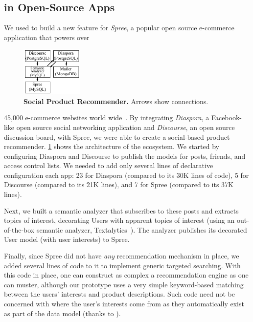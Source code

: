 \subsection{\synapse in Open-Source Apps}
\label{synapse:sec:apps:social}
\begingroup
\setlength{\columnsep}{6pt}
We used \synapse to build a new feature for \emph{Spree}, a popular open source
e-commerce application that powers over
\begin{figure}
\centering
   \includegraphics[width=1.2in]{figures/synapse/eco-social.pdf}
      \vspace{-6pt}
   \caption{\textbf{Social Product Recommender.} Arrows show \synapse
connections.}
   \label{synapse:fig:social-ecosystem}
\end{figure}
45,000 e-commerce websites world
wide~\cite{spree-site}.
By integrating \emph{Diaspora}, a Facebook-like open source social networking
application and \emph{Discourse}, an open source discussion board, with Spree,
we
were able to create a social-based product recommender.
\F\ref{synapse:fig:social-ecosystem} shows the architecture of the ecosystem.
We started by configuring Diaspora and Discourse to publish the models
for posts, friends, and access control lists.
We needed to add only several lines of declarative configuration each app: 23
for Diaspora (compared to its 30K lines of code), 5 for Discourse (compared to
its 21K lines), and 7 for Spree (compared to its 37K lines).

Next, we built a semantic analyzer that subscribes to these posts and extracts topics of interest, decorating Users with apparent topics of interest (using an out-of-the-box semantic analyzer, Textalytics~\cite{textalytics}).
The analyzer publishes its decorated {\code User} model (with user interests) to Spree.
\endgroup

Finally, since Spree did not have \emph{any} recommendation mechanism in place, we added several lines of code to it to implement generic targeted searching.
With this code in place, one can construct as complex a recommendation engine as
one can muster, although our prototype uses a very simple keyword-based matching
between the users' interests and product descriptions. Such code need not be
concerned with where the user's interests come from as they
automatically exist as part of the data model (thanks to \synapse).


